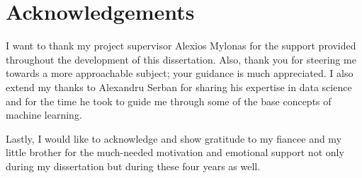 \chapter*{Acknowledgements}
I want to thank my project supervisor Alexios Mylonas for the support provided throughout the development of this dissertation. Also, thank you for steering me towards a more approachable subject; your guidance is much appreciated. I also extend my thanks to Alexandru Serban for sharing his expertise in data science and for the time he took to guide me through some of the base concepts of machine learning.

Lastly, I would like to acknowledge and show gratitude to my fiancee and my little brother for the much-needed motivation and emotional support not only during my dissertation but during these four years as well.
